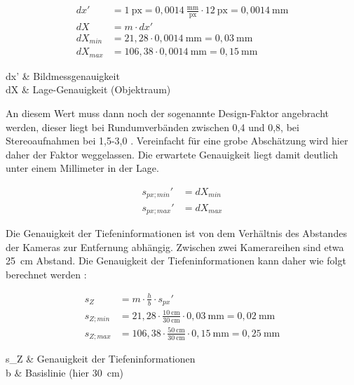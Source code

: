 \documentclass[./00PhotoBox.tex]{subfiles}
\begin{document}
\begin{align}
    dx'      & = 1~\text{px} = 0,0014~\frac{\text{mm}}{\text{px}} \cdot 12~\text{px} = 0,0014~\text{mm} \\
    dX       & = m \cdot dx'                                                                            \\
    dX_{min} & = 21,28 \cdot 0,0014~\text{mm} = 0,03~\text{mm}                                          \\
    dX_{max} & = 106,38 \cdot 0,0014~\text{mm} = 0,15~\text{mm}
\end{align}
\begin{conditions}
    dx' & Bildmessgenauigkeit \\
    dX  & Lage-Genauigkeit (Objektraum)
\end{conditions}

An diesem Wert muss dann noch der sogenannte Design-Faktor angebracht werden, dieser liegt bei Rundumverbänden zwischen 0,4 und 0,8, bei Stereoaufnahmen bei 1,5-3,0 \citep[S. 174]{luhmann}. Vereinfacht für eine grobe Abschätzung wird hier daher der Faktor weggelassen. Die erwartete Genauigkeit liegt damit deutlich unter einem Millimeter in der Lage.

\begin{align}
    s_{px; min}' & = dX_{min} \\
    s_{px; max}' & = dX_{max}
\end{align}

Die Genauigkeit der Tiefeninformationen ist von dem Verhältnis des Abstandes der Kameras zur Entfernung abhängig. Zwischen zwei Kamerareihen sind etwa 25~cm Abstand. Die Genauigkeit der Tiefeninformationen kann daher wie folgt berechnet werden \citep[S. 174]{luhmann}:

\begin{align}
    s_Z       & = m \cdot \frac{h}{b} \cdot s_{px}'                                                    \\
    s_{Z;min} & = 21,28 \cdot \frac{10~\text{cm}}{30~\text{cm}}\cdot 0,03~\text{mm}  = 0,02~\text{mm}  \\
    s_{Z;max} & = 106,38 \cdot \frac{50~\text{cm}}{30~\text{cm}} \cdot 0,15~\text{mm} = 0,25~\text{mm}
\end{align}
\begin{conditions}
    s_Z & Genauigkeit der Tiefeninformationen \\
    b   & Basislinie (hier 30~cm)
\end{conditions}
\end{document}
